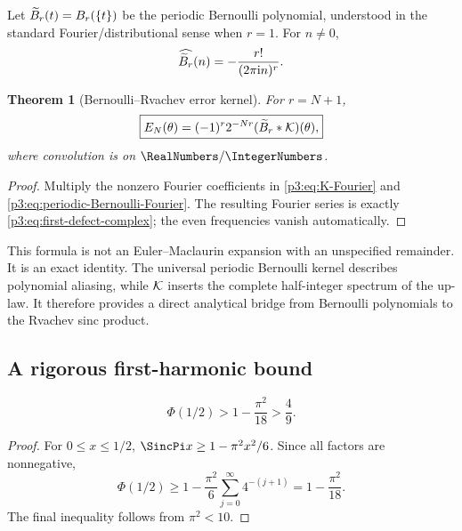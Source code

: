 \documentclass[11pt,oneside]{article}
\numberwithin{equation}{section}
\newtheorem{theorem}{Theorem}[section]
\theoremstyle{definition}
\theoremstyle{remark}
\begin{document}
Let $\widetilde B_r(t)=B_r(\{t\})$ be the periodic Bernoulli polynomial, understood in the standard Fourier/distributional sense when $r=1$.  For $n\ne0$,
\begin{equation}
 \widehat{\widetilde B_r}(n)=-\frac{r!}{(2\pi\mathrm i n)^r}.
 \label{p3:eq:periodic-Bernoulli-Fourier}
\end{equation}

\begin{theorem}[Bernoulli--Rvachev error kernel]
\label{p3:thm:Bernoulli-convolution}
For $r=N+1$,
\begin{equation}
 \boxed{\displaystyle
 E_N(\theta)=(-1)^r2^{-Nr}
 (\widetilde B_r*\mathcal K)(\theta),}
 \label{p3:eq:Bernoulli-convolution}
\end{equation}
where convolution is on $\RealNumbers/\IntegerNumbers$.
\end{theorem}

\begin{proof}
Multiply the nonzero Fourier coefficients in \eqref{p3:eq:K-Fourier} and \eqref{p3:eq:periodic-Bernoulli-Fourier}.  The resulting Fourier series is exactly \eqref{p3:eq:first-defect-complex}; the even frequencies vanish automatically.
\end{proof}

\begin{remark}
This formula is not an Euler--Maclaurin expansion with an unspecified remainder.  It is an exact identity.  The universal periodic Bernoulli kernel describes polynomial aliasing, while $\mathcal K$ inserts the complete half-integer spectrum of the up-law.  It therefore provides a direct analytical bridge from Bernoulli polynomials to the Rvachev sinc product.
\end{remark}

\subsection{A rigorous first-harmonic bound}

\begin{lemma}
\label{p3:lem:phi-half-lower}
\begin{equation}
 \Phi(1/2)>1-\frac{\pi^2}{18}>\frac49.
 \label{p3:eq:phi-half-lower}
\end{equation}
\end{lemma}

\begin{proof}
For $0\le x\le1/2$, $\SincPi x\ge1-\pi^2x^2/6$.  Since all factors are nonnegative,
\[
 \Phi(1/2)
 \ge1-\frac{\pi^2}{6}\sum_{j=0}^{\infty}4^{-(j+1)}
 =1-\frac{\pi^2}{18}.
\]
The final inequality follows from $\pi^2<10$.
\end{proof}
\end{document}
